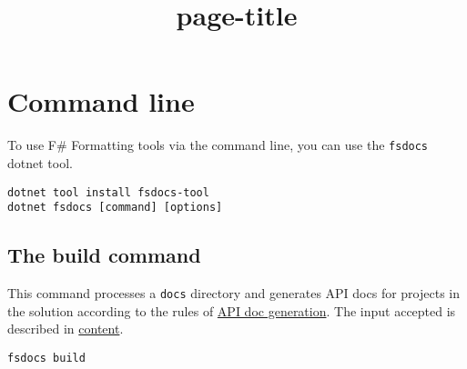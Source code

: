 \documentclass{article}
\title{{page-title}}
\date{}
\begin{document}
\maketitle


\section*{Command line}



To use F\# Formatting tools via the command line, you can use the \texttt{fsdocs} dotnet tool.
\begin{lstlisting}
dotnet tool install fsdocs-tool
dotnet fsdocs [command] [options]

\end{lstlisting}
\subsection*{The build command}



This command processes a \texttt{docs} directory and generates API docs for projects in the solution according to the
rules of \href{apidocs.html}{API doc generation}. The input accepted is described in \href{content.html}{content}.
\begin{lstlisting}
fsdocs build

\end{lstlisting}
\end{document}
